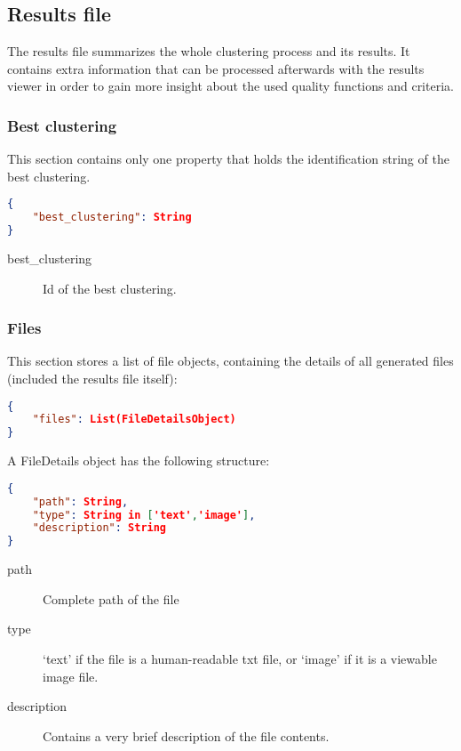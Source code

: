 \subsection{Results file}

The results file summarizes the whole clustering process and its results.
It contains extra information that can be processed afterwards with
the results viewer in order to gain more insight about the used quality
functions and criteria.


\subsubsection{Best clustering}

This section contains only one property that holds the identification string of the best
clustering.
\begin{lstlisting}[caption={Best clustering result ID},firstnumber=1,language=json]
{
	"best_clustering": String
}
\end{lstlisting}

\begin{description}
\item [best\_clustering] Id of the best clustering.
\end{description}

\subsubsection{Files}

This section stores a list of file objects, containing the details
of all generated files (included the results file itself):

\begin{lstlisting}[caption={The file details section of the results file},firstnumber=1,language=json]
{
	"files": List(FileDetailsObject)
}
\end{lstlisting}
A FileDetails object has the following structure:

\begin{lstlisting}[caption={FileDetails object},firstnumber=1,language=json]
{
	"path": String,
	"type": String in ['text','image'],
	"description": String
}
\end{lstlisting}

\begin{description}
\item [{path}] Complete path of the file
\item [{type}] `text' if the file is a human-readable txt file, or `image'
if it is a viewable image file.
\item [{description}] Contains a very brief description of the file contents.
\end{description}

